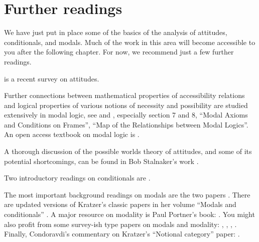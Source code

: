 \section{Further readings}

We have just put in place some of the basics of the analysis of attitudes,
conditionals, and modals. Much of the work in this area will become accessible
to you after the following chapter. For now, we recommend just a few
further readings.

\cite{swanson-2011-hsk-attitudes} is a recent survey on attitudes.

Further connections between mathematical properties of accessibility relations
and logical properties of various notions of necessity and possibility are
studied extensively in modal logic, see \cite{hughes-cresswell-1996-new} and
\cite{garson-2018-sep-logic-modal}, especially section 7 and 8, ``Modal Axioms
and Conditions on Frames'', ``Map of the Relationships between Modal Logics''. 
%
An open access textbook on modal logic is \cite{zach-2019-open-modal}.

A thorough discussion of the possible worlds theory of attitudes, and some of
its potential shortcomings, can be found in Bob Stalnaker's work
\citeyearpar{stalnaker-1984-inquiry,stalnaker-1999-contextandcontent}.

Two introductory readings on conditionals are
\cite{fintel-2011-hsk-conditionals,fintel-2012-subjunctives}.

The most important background readings on modals are the two papers
\cite{kratzer-1981-notional,kratzer-1991-modality}. There are updated versions
of Kratzer's classic papers in her volume ``Modals and conditionals''
\parencite{kratzer-2012-book}. A major resource on modality is Paul Portner's
book: \cite{portner-2009-modality-book}. You might also profit from some
survey-ish type papers on modals and modality: \cite{fintel-2005-modality},
\cite{fintel-gillies-2007-OpinionatedGuideEpistemicModality},
\cite{swanson-2008-modality}, \cite{hacquard-2011-Modality}. Finally,
Condoravdi's commentary on Kratzer's ``Notional category'' paper:
\cite{condoravdi-2022-KratzerNotionalCategoryModality}.

